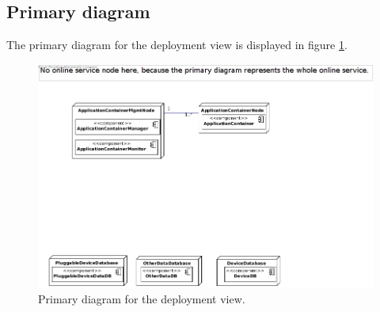 \begin{landscape}
    \section{Primary diagram}
    The primary diagram for the deployment view is displayed in figure \ref{fig:depl_primary}.

    \centering
    \vspace*{\fill}

        \begin{figure}[!htp]
        	\centering
            \includegraphics[width=\textwidth]{images/deployment-primary}
        	\caption{Primary diagram for the deployment view.}\label{fig:depl_primary}
        \end{figure}

    \vfill
\end{landscape}

